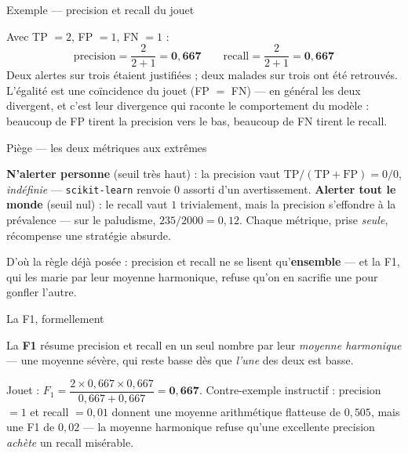 \documentclass[aspectratio=169,11pt]{beamer}
\begin{document}
\begin{frame}{Exemple — precision et recall du jouet}
\begin{ucadex}
{\small Avec TP $= 2$, FP $= 1$, FN $= 1$ :
\[ \text{precision} = \frac{2}{2+1} = \mathbf{0{,}667} \qquad \text{recall} = \frac{2}{2+1} = \mathbf{0{,}667} \]
Deux alertes sur trois étaient justifiées ; deux malades sur trois ont été retrouvés. L'égalité est une coïncidence du jouet (FP $=$ FN) — en général les deux divergent, et c'est leur divergence qui raconte le comportement du modèle : beaucoup de FP tirent la precision vers le bas, beaucoup de FN tirent le recall.}
\end{ucadex}
\end{frame}

\begin{frame}{Piège — les deux métriques aux extrêmes}
\begin{ucadpiege}
{\small \textbf{N'alerter personne} (seuil très haut) : la precision vaut $\text{TP}/(\text{TP}+\text{FP}) = 0/0$, \emph{indéfinie} — \texttt{scikit-learn} renvoie $0$ assorti d'un avertissement. \textbf{Alerter tout le monde} (seuil nul) : le recall vaut $1$ trivialement, mais la precision s'effondre à la prévalence — sur le paludisme, $235/2000 = 0{,}12$. Chaque métrique, prise \emph{seule}, récompense une stratégie absurde.}
\end{ucadpiege}
{\small D'où la règle déjà posée : precision et recall ne se lisent qu'\textbf{ensemble} — et la F1, qui les marie par leur moyenne harmonique, refuse qu'on en sacrifie une pour gonfler l'autre.}
\end{frame}

\begin{frame}{La F1, formellement}
\begin{ucaddef}[Définition]
{\small La \textbf{F1} résume precision et recall en un seul nombre par leur \emph{moyenne harmonique} — une moyenne sévère, qui reste basse dès que \emph{l'une} des deux est basse.}
\end{ucaddef}
{\small Jouet : $F_1 = \dfrac{2 \times 0{,}667 \times 0{,}667}{0{,}667 + 0{,}667} = \mathbf{0{,}667}$. Contre-exemple instructif : precision $= 1$ et recall $= 0{,}01$ donnent une moyenne arithmétique flatteuse de $0{,}505$, mais une F1 de $0{,}02$ — la moyenne harmonique refuse qu'une excellente precision \emph{achète} un recall misérable.}
\end{frame}
\end{document}
